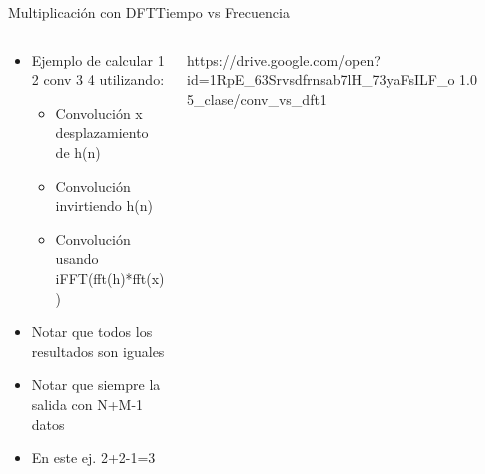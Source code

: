 \begin{frame}{Multiplicación con DFT}{Tiempo vs Frecuencia}
   \begin{columns}[c]
      \begin{column}{.4\textwidth}
         \tiny
         \begin{itemize}
            \item{Ejemplo de calcular 1 2 conv 3 4 utilizando:}
               \begin{itemize}
                     \tiny
                  \item{Convolución x desplazamiento de h(n)}
                  \item{Convolución invirtiendo h(n)}
                  \item{Convolución usando iFFT(fft(h)*fft(x))}
               \end{itemize}
            \item{Notar que todos los resultados son iguales}
            \item{Notar que siempre la salida con N+M-1 datos}
            \item{En este ej. 2+2-1=3}
         \end{itemize}
      \end{column}
      \hspace{2pt}
      \vrule
      \hspace{2pt}
      \begin{column}{.6\textwidth}
         {https://drive.google.com/open?id=1RpE_63Srvsdfrnsab7lH_73yaFsILF_o}
         {1.0}
         {5_clase/conv_vs_dft1}
      \end{column}
      \hspace{2pt}
   \end{columns}
   \vfill
\end{frame}
